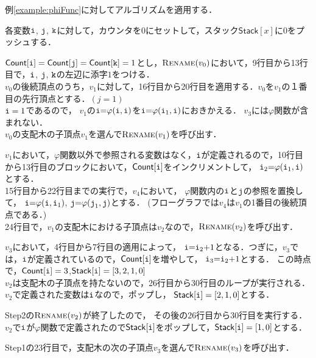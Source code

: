 \documentclass[dvipdfmx,a4j]{jbook}
\begin{document}
例\ref{example:phiFunc}に対してアルゴリズムを適用する．
\begin{trivlist}
    \item[{\bf 初期化:}] 各変数$\texttt{i}$, $\texttt{j}$, $\texttt{k}$に対して，カウンタを$0$にセットして，スタック$\mathsf{Stack}[x]$に$0$をプッシュする．
    \item[{\bf Step1:}] $\mathsf{Count}[\texttt{i}]=\mathsf{Count}[\texttt{j}]=\mathsf{Count}[\texttt{k}]=1$とし，$\textsc{Rename}(v_0)$において，9行目から13行目で，$\texttt{i}$, $\texttt{j}$, $\texttt{k}$の左辺に添字$1$をつける．\\
    $v_0$の後続頂点のうち，$v_1$に対して，16行目から20行目を適用する．$v_0$を$v_1$の１番目の先行頂点とする．$(j=1)$ \\
    $\texttt{i}=1$であるので，
    $v_1$の$\texttt{i}{\tt =}\varphi(\texttt{i},\texttt{i})$を$\texttt{i}{\tt =}\varphi(\texttt{i}_1,\texttt{i})$におきかえる．
    $v_3$には$\varphi$関数が含まれない．\\
    $v_0$の支配木の子頂点$v_1$を選んで$\textsc{Rename}(v_1)$を呼び出す．
    \item[{\bf Step2:}]
    $v_1$において，$\varphi$関数以外で参照される変数はなく，$\texttt{i}$が定義されるので，10行目から13行目のブロックにおいて，$\mathsf{Count}[\texttt{i}]$をインクリメントして，
    $\texttt{i}_2{\tt =}\varphi(\texttt{i}_1,\texttt{i})$とする．\\
    15行目から22行目までの実行で，$v_4$において，
    $\varphi$関数内の$\texttt{i}$と$\texttt{j}$の参照を置換して，
    $\texttt{i}{\tt =}\varphi(\texttt{i},\texttt{i}_1)$,
    $\texttt{j}{\tt =}\varphi(\texttt{j}_1,\texttt{j})$とする．
    (フローグラフでは$v_4$は$v_1$の1番目の後続頂点である．)\\
    24行目で，$v_1$の支配木における子頂点は$v_2$なので，$\textsc{Rename}(v_2)$を呼び出す．
    \item[{\bf Step3:}] $v_3$において，4行目から7行目の適用によって，
    $\texttt{i}{\tt =}\texttt{i}_2{\tt +} 1$となる．つぎに，$v_3$では，$\texttt{i}$が定義されているので，$\mathsf{Count}[\texttt{i}]$を増やして，
    $\texttt{i}_3{\tt =}\texttt{i}_2{\tt +} 1$とする．
    この時点で，$\mathsf{Count}[\texttt{i}]=3$,$\mathsf{Stack}[\texttt{i}]=[3,2,1,0]$\\
    $v_2$は支配木の子頂点を持たないので，26行目から30行目のループが実行される．$v_2$で定義された変数は$\texttt{i}$なので，ポップし，
    $\mathsf{Stack}[\texttt{i}]=[2,1,0]$とする．
    \item[{\bf Step2':}] Step2の$\textsc{Rename}(v_2)$が終了したので，
    その後の26行目から30行目を実行する．
    $v_2$で$\texttt{i}$が$\varphi$関数で定義されたので$\mathsf{Stack}[\texttt{i}]$をポップして，$\mathsf{Stack}[\texttt{i}]=[1,0]$とする．
    \item[{\bf }] Step1の23行目で，支配木の次の子頂点$v_3$を選んで$\textsc{Rename}(v_3)$を呼び出す．

\end{trivlist}
\end{document}
